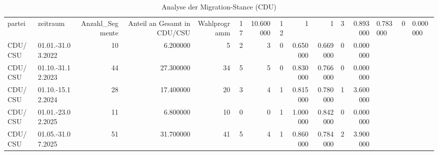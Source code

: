 \begin{table}
\caption{Analyse der Migration-Stance (CDU)}
\label{tab:meine_tabelle}
\begin{tabular}{llrrrrrrrrrr}
\toprule
partei & zeitraum & Anzahl_Segmente & Anteil an Gesamt in %
\midrule
CDU/CSU & Wahlprogramm & 17 & 10.600000 & 12 & 1 & 1 & 3 & 0.893000 & 0.783000 & 0 & 0.000000 \\
CDU/CSU & 01.01.-31.03.2022 & 10 & 6.200000 & 5 & 2 & 3 & 0 & 0.650000 & 0.669000 & 0 & 0.000000 \\
CDU/CSU & 01.10.-31.12.2023 & 44 & 27.300000 & 34 & 5 & 5 & 0 & 0.830000 & 0.766000 & 0 & 0.000000 \\
CDU/CSU & 01.10.-15.12.2024 & 28 & 17.400000 & 20 & 3 & 4 & 1 & 0.815000 & 0.780000 & 1 & 3.600000 \\
CDU/CSU & 01.01.-23.02.2025 & 11 & 6.800000 & 10 & 0 & 0 & 1 & 1.000000 & 0.842000 & 0 & 0.000000 \\
CDU/CSU & 01.05.-31.07.2025 & 51 & 31.700000 & 41 & 5 & 4 & 1 & 0.860000 & 0.784000 & 2 & 3.900000 \\
\bottomrule
\end{tabular}
\end{table}
